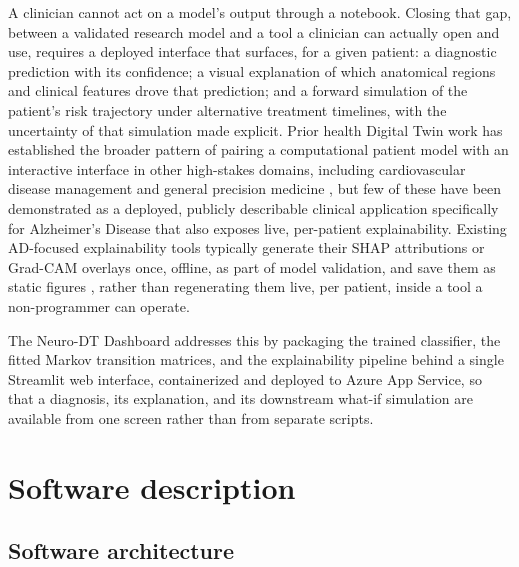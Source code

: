 \documentclass[5p,times,twocolumn]{elsarticle}
\begin{document}
A clinician cannot act on a model's output through a notebook. Closing that gap, between a validated research model and a tool a clinician can actually open and use, requires a deployed interface that surfaces, for a given patient: a diagnostic prediction with its confidence; a visual explanation of which anatomical regions and clinical features drove that prediction; and a forward simulation of the patient's risk trajectory under alternative treatment timelines, with the uncertainty of that simulation made explicit. Prior health Digital Twin work has established the broader pattern of pairing a computational patient model with an interactive interface in other high-stakes domains, including cardiovascular disease management and general precision medicine \cite{bib_dt_precision,bib_dt_modular,bib_dt_cardio}, but few of these have been demonstrated as a deployed, publicly describable clinical application specifically for Alzheimer's Disease that also exposes live, per-patient explainability. Existing AD-focused explainability tools typically generate their SHAP attributions or Grad-CAM overlays once, offline, as part of model validation, and save them as static figures \cite{bib_qiu,bib_axial}, rather than regenerating them live, per patient, inside a tool a non-programmer can operate.

The Neuro-DT Dashboard addresses this by packaging the trained classifier, the fitted Markov transition matrices, and the explainability pipeline behind a single Streamlit web interface, containerized and deployed to Azure App Service, so that a diagnosis, its explanation, and its downstream what-if simulation are available from one screen rather than from separate scripts.

\section{Software description}\label{sec2}

\subsection{Software architecture}\label{sec2_1}
\end{document}
